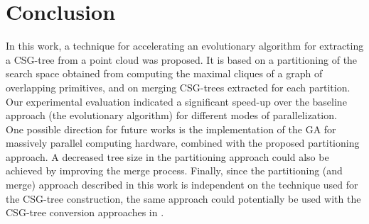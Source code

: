 \section{Conclusion}
\label{sec:conclusion}
In this work, a technique for accelerating an evolutionary algorithm for extracting 
a \ac{CSG}-tree from a point cloud was proposed. It is based on a partitioning of the search space obtained 
from computing the maximal cliques of a graph of overlapping primitives, and on merging \ac{CSG}-trees 
extracted for each partition. 
Our experimental evaluation indicated a significant speed-up over the baseline approach (the evolutionary algorithm) for different modes of parallelization.
\\
One possible direction for future works is 
the implementation of the \ac{GA} for massively parallel computing hardware, combined with the proposed partitioning approach. 
A decreased tree size in the partitioning approach could also be achieved by improving the merge process.
Finally, since the partitioning (and merge) approach described in this work is independent on the technique used for the \ac{CSG}-tree construction, the same approach could potentially be used with the \ac{CSG}-tree conversion approaches in \cite{shapiro1991construction,buchele2004three}. 
